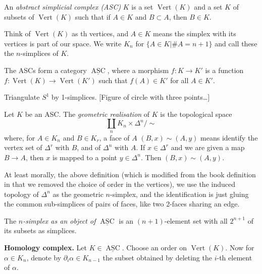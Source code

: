 \begin{definition}
\label{definition-abstract-simplicial-cx}
An {\it abstract simplicial complex (ASC)} 
$K$ is a set $\operatorname{Vert}(K)$
and a set $K$ of subsets of
$\operatorname{Vert}(K)$ such that
if $A \in K$ and $B \subset A$,
then $B \in K$.
\end{definition}

\noindent
Think of $\operatorname{Vert}(K)$
as th vertices, and $A \in K$ means
the simplex with its vertices is part of our
space. We write $K_n$ for
$\{A \in K|\# A = n+1\}$
and call these the $n$-simplices of $K$.

The ASCs form a category
$\underline{\operatorname{ASC}}$,
where a morphism $f:K \to K'$
is a function
$f:\operatorname{Vert}(K) \to
\operatorname{Vert}(K')$
such that $f(A) \in K'$ for all
$A \in K'$.

\begin{example}
\label{example-triangulate-s1}
Triangulate $S^1$ by 1-simplices.
[Figure of circle with three points…]
\end{example}

\begin{definition}
\label{definition-geometric-realization}
Let $K$ be an ASC.
The {\it geometric realisation} of $K$
is the topological space
$$
\coprod_n K_n \times \Delta^n/ \sim
$$
where, for $A \in K_n$ and
$B \in K_r$, a face of $A$
$(B,x) \sim (A,y)$
means identify the vertex set of $\Delta^r$
with $B$, and of $\Delta^n$
with $A$.
If $x \in \Delta^r$ and we are given a map
$B \to A$,
then $x$ is mapped to a point $y \in
\Delta^n$.
Then $(B,x) \sim (A,y)$.
\end{definition}

\noindent At least morally, the above
definition (which is modified from the book
definition in that we removed the choice of
order in the vertices), we use the
induced topology of $\Delta^n$ as
the geometric $n$-simplex, and the
identification is just gluing the
common sub-simplices of pairs of faces,
like two 2-faces sharing an edge.

\begin{definition}
\label{definition-asc-n-simplex}
The {\it  $n$-simplex as an object of 
$\underline{\operatorname{ASC}}$}
is an $(n+1)$-element set with all
$2^{n+1}$ of its subsets as simplices.
\end{definition}

\medskip\noindent
{\bf Homology complex.} Let $K \in
\underline{\operatorname{ASC}}$.
Choose an order on $\operatorname{Vert}(K)$.
Now for $\alpha \in K_n$,
denote by $\partial_i \alpha \in K_{n-1}$
the subset obtained by deleting the $i$-th
element of $\alpha$.

